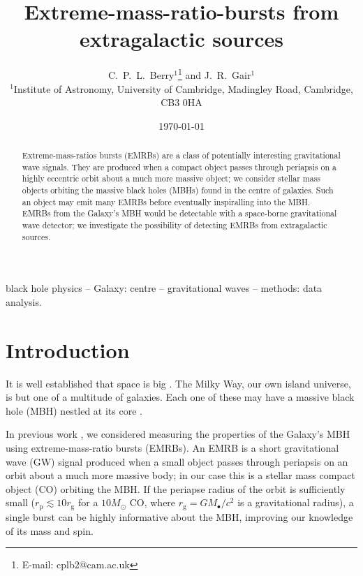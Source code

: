 \documentclass[useAMS,usedcolumn,usegraphicx,usenatbib]{mn2e}
\title[EMRBs from extragalactic sources]{Extreme-mass-ratio-bursts from extragalactic sources}
\author[C.\ P.\ L.\ Berry and J.\ R.\ Gair]{C.\ P.\ L.\ Berry$^{1}$\thanks{E-mail: cplb2@cam.ac.uk} and J.\ R.\ Gair$^{1}$\\
$^{1}$Institute of Astronomy, University of Cambridge, Madingley Road, Cambridge, CB3 0HA}
\newcommand{\sub}[1]{\ensuremath{_\mathrm{#1}}}
\begin{document}
\date{\today}

\pagerange{\pageref{firstpage}--\pageref{lastpage}} 

\maketitle

\label{firstpage}

\begin{abstract}
Extreme-mass-ratios bursts (EMRBs) are a class of potentially interesting gravitational wave signals. They are produced when a compact object passes through periapsis on a highly eccentric orbit about a much more massive object; we consider stellar mass objects orbiting the massive black holes (MBHs) found in the centre of galaxies. Such an object may emit many EMRBs before eventually inspiralling into the MBH. EMRBs from the Galaxy's MBH would be detectable with a space-borne gravitational wave detector; we investigate the possibility of detecting EMRBs from extragalactic sources. 

\end{abstract}

\begin{keywords}
black hole physics -- Galaxy: centre -- gravitational waves -- methods: data analysis.
\end{keywords}

\section{Introduction}\label{sec:Intro}

It is well established that space is big \citep[chapter 8]{Adams1979}. The Milky Way, our own island universe, is but one of a multitude of galaxies. Each one of these may have a massive black hole (MBH) nestled at its core \citep{Lynden-Bell1971, Soltan1982}.

In previous work \citep{Berry2013}, we considered measuring the properties of the Galaxy's MBH using extreme-mass-ratio bursts (EMRBs). An EMRB is a short gravitational wave (GW) signal produced when a small object passes through periapsis on an orbit about a much more massive body; in our case this is a stellar mass compact object (CO) orbiting the MBH. If the periapse radius of the orbit is sufficiently small ($r\sub{p} \lesssim 10 r\sub{g}$ for a $10 M_\odot$ CO, where $r\sub{g} = GM_\bullet/c^2$ is a gravitational radius), a single burst can be highly informative about the MBH, improving our knowledge of its mass and spin.
\end{document}

